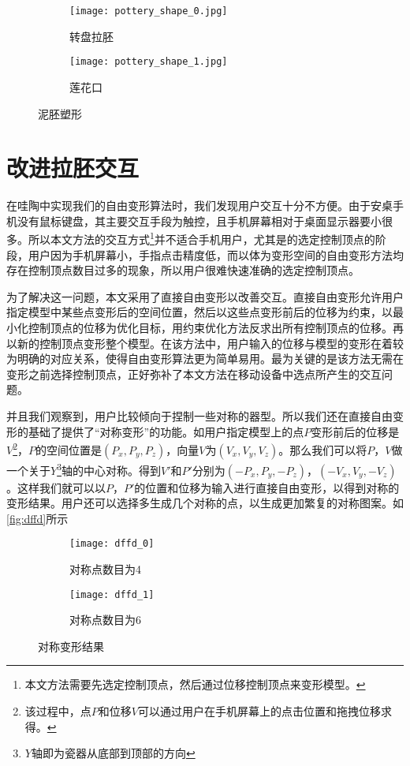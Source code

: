 \begin{figure}[htbp]
	\centering
	\begin{subfigure}[b]{.4\textwidth}
		\centering
		\texttt{[image: pottery\_shape\_0.jpg]}
		\caption{转盘拉胚}\label{subfig:pottery_shape_0}
	\end{subfigure}
	\begin{subfigure}[b]{.4\textwidth}
		\centering
		\texttt{[image: pottery\_shape\_1.jpg]}
		\caption{莲花口}\label{subfig:pottery_shape_1}
	\end{subfigure}
	\caption{泥胚塑形}\label{fig:pottery_shape}
\end{figure}

\section{改进拉胚交互}
在哇陶中实现我们的自由变形算法时，我们发现用户交互十分不方便。由于安桌手机没有鼠标键盘，其主要交互手段为触控，且手机屏幕相对于桌面显示器要小很多。所以本文方法的交互方式\footnote{本文方法需要先选定控制顶点，然后通过位移控制顶点来变形模型。}并不适合手机用户，尤其是的选定控制顶点的阶段，用户因为手机屏幕小，手指点击精度低，而以体为变形空间的自由变形方法均存在控制顶点数目过多的现象，所以用户很难快速准确的选定控制顶点。

为了解决这一问题，本文采用了直接自由变形\cite{hsu1992}以改善交互。直接自由变形允许用户指定模型中某些点变形后的空间位置，然后以这些点变形前后的位移为约束，以最小化控制顶点的位移为优化目标，用约束优化方法反求出所有控制顶点的位移。再以新的控制顶点变形整个模型。在该方法中，用户输入的位移与模型的变形在着较为明确的对应关系，使得自由变形算法更为简单易用。最为关键的是该方法无需在变形之前选择控制顶点，正好弥补了本文方法在移动设备中选点所产生的交互问题。

并且我们观察到，用户比较倾向于捏制一些对称的器型。所以我们还在直接自由变形的基础了提供了“对称变形”的功能。如用户指定模型上的点$P$变形前后的位移是$V$\footnote{该过程中，点$P$和位移$V$可以通过用户在手机屏幕上的点击位置和拖拽位移求得。}，$P$的空间位置是$(P_x, P_y, P_z)$，向量$V$为$(V_x, V_y, V_z)$。那么我们可以将$P$，$V$做一个关于$Y$\footnote{$Y$轴即为瓷器从底部到顶部的方向}轴的中心对称。得到$V'$和$P'$分别为$(-P_x, P_y, -P_z)$，$(-V_x, V_y, -V_z)$。这样我们就可以以$P$，$P'$的位置和位移为输入进行直接自由变形，以得到对称的变形结果。用户还可以选择多生成几个对称的点，以生成更加繁复的对称图案。如\autoref{fig:dffd}所示

\begin{figure}[htbp]
	\centering
	\begin{subfigure}[b]{.4\textwidth}
		\centering
		\texttt{[image: dffd\_0]}
		\caption{对称点数目为4}\label{subfig:dffd_0}
	\end{subfigure}
	\begin{subfigure}[b]{.4\textwidth}
		\centering
		\texttt{[image: dffd\_1]}
		\caption{对称点数目为6}\label{subfig:dffd_1}
	\end{subfigure}
	\caption{对称变形结果}\label{fig:dffd}
\end{figure}
